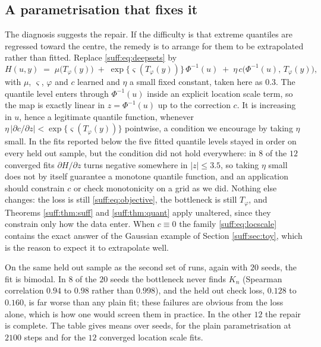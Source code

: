 \subsection{A parametrisation that fixes it}
\label{suff:sec:locscale}

The diagnosis suggests the repair. If the difficulty is that extreme quantiles are regressed
toward the centre, the remedy is to arrange for them to be extrapolated rather than fitted.
Replace \eqref{suff:eq:deepsets} by
\begin{equation}
H(u,y)\;=\;\mu\big(T_\varphi(y)\big)\;+\;\exp\!\big\{\varsigma(T_\varphi(y))\big\}\,\Phi^{-1}(u)
\;+\;\eta\,c\big(\Phi^{-1}(u),\,T_\varphi(y)\big),
\label{suff:eq:locscale}
\end{equation}
with $\mu$, $\varsigma$, $\varphi$ and $c$ learned and $\eta$ a small fixed constant, taken
here as $0.3$. The quantile level enters through $\Phi^{-1}(u)$ inside an explicit location
scale term, so the map is exactly linear in $z=\Phi^{-1}(u)$ up to the correction $c$. It is
increasing in $u$, hence a legitimate quantile function, whenever
$\eta\,|\partial c/\partial z|<\exp\{\varsigma(T_\varphi(y))\}$ pointwise, a condition we
encourage by taking $\eta$ small. In the fits reported below the five fitted quantile levels stayed in order on every held out sample, but the condition did not hold everywhere: in $8$ of the $12$ converged fits $\partial H/\partial z$ turns negative somewhere in $|z|\le3.5$, so taking $\eta$ small does not by itself guarantee a monotone quantile function, and an application should constrain $c$ or check monotonicity on a grid as we did. Nothing else
changes: the loss is still \eqref{suff:eq:objective}, the bottleneck is still $T_\varphi$, and
Theorems \ref{suff:thm:suff} and \ref{suff:thm:quant} apply unaltered, since they constrain
only how the data enter. When $c\equiv0$ the family \eqref{suff:eq:locscale} contains the exact
answer of the Gaussian example of Section \ref{suff:sec:toy}, which is the reason to expect it
to extrapolate well.

On the same held out sample as the second set of runs, again with $20$ seeds, the fit is bimodal. In $8$ of the $20$ seeds the bottleneck never finds $K_n$ (Spearman correlation $0.94$ to $0.98$ rather than $0.998$), and the held out check loss, $0.128$ to $0.160$, is far worse than any plain fit; these failures are obvious from the loss alone, which is how one would screen them in practice. In the other $12$ the repair is complete. The table gives means over seeds, for the plain parametrisation at $2100$ steps and for the $12$ converged location scale fits.

